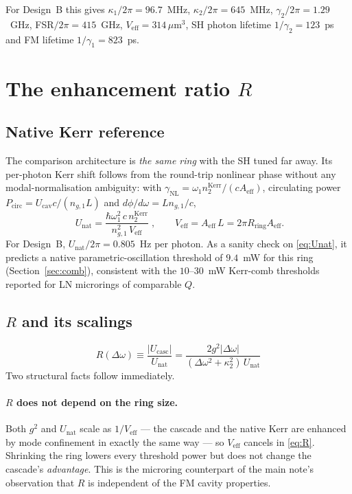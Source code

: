 \documentclass[11pt,a4paper]{article}
\newcommand{\Dom}{\Delta\omega}
\newcommand{\Ucasc}{U_{\text{casc}}}
\newcommand{\Unat}{U_{\text{nat}}}
\newcommand{\Veff}{V_{\text{eff}}}
\newcommand{\Aeff}{A_{\text{eff}}}
\begin{document}
For Design~B this gives $\kappa_1/2\pi=96.7$~MHz,
$\kappa_2/2\pi=645$~MHz, $\gamma_2/2\pi=1.29$~GHz,
FSR$/2\pi=415$~GHz, $\Veff=314\,\mu$m$^3$, SH photon lifetime
$1/\gamma_2=123$~ps and FM lifetime $1/\gamma_1=823$~ps.

\section{The enhancement ratio \texorpdfstring{$R$}{R}}\label{sec:R}

\subsection{Native Kerr reference}

The comparison architecture is \emph{the same ring} with the SH tuned
far away.  Its per-photon Kerr shift follows from the round-trip
nonlinear phase without any modal-normalisation ambiguity: with
$\gamma_{\text{NL}}=\omega_1n_2^{\text{Kerr}}/(c\Aeff)$, circulating
power $P_{\text{circ}}=U_{\text{cav}}c/(n_{g,1}L)$ and
$d\phi/d\omega=Ln_{g,1}/c$,
\begin{equation}
  \boxed{\;\Unat=\frac{\hbar\omega_1^2\,c\,n_2^{\text{Kerr}}}
                      {n_{g,1}^2\,\Veff}\;},
  \qquad \Veff=\Aeff\,L=2\pi R_{\text{ring}}\Aeff .
  \label{eq:Unat}
\end{equation}
For Design~B, $\Unat/2\pi=0.805$~Hz per photon.  As a sanity check on
\eqref{eq:Unat}, it predicts a native parametric-oscillation threshold
of $9.4$~mW for this ring (Section~\ref{sec:comb}), consistent with the
$10$--$30$~mW Kerr-comb thresholds reported for LN microrings of
comparable $Q$.

\subsection{\texorpdfstring{$R$}{R} and its scalings}

\begin{equation}
  \boxed{\;R(\Dom)\equiv\frac{|\Ucasc|}{\Unat}
   =\frac{2g^2|\Dom|}{(\Dom^2+\kappa_2^2)\,\Unat}\;}
  \label{eq:R}
\end{equation}
Two structural facts follow immediately.

\paragraph{$R$ does not depend on the ring size.}  Both $g^2$ and
$\Unat$ scale as $1/\Veff$ --- the cascade and the native Kerr are
enhanced by mode confinement in exactly the same way --- so $\Veff$
cancels in \eqref{eq:R}.  Shrinking the ring lowers every threshold
power but does not change the cascade's \emph{advantage}.  This is the
microring counterpart of the main note's observation that $R$ is
independent of the FM cavity properties.
\end{document}

